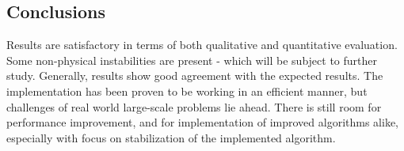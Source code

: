 \subsection{Conclusions}
Results are satisfactory in terms of both qualitative and quantitative evaluation. Some non-physical instabilities are present - which will be subject to further study. Generally, results show good agreement with the expected results. The implementation has been proven to be working in an efficient manner, but challenges of real world large-scale problems lie ahead. There is still room for performance improvement, and for implementation of improved algorithms alike, especially with focus on stabilization of the implemented algorithm.